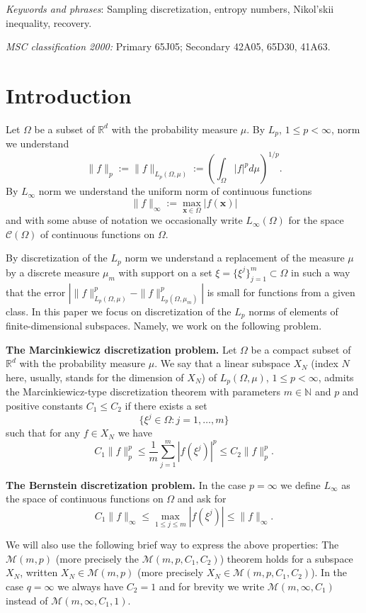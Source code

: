 \documentclass[12pt]{article}
\newcommand{\N}{{\mathbb{N}}}
\def\cC{{\mathcal C}}
\def \cM{\mathcal M}
\def\R{{\mathbb R}}
\def\bx{\mathbf x}
\numberwithin{equation}{section}
\newcommand{\be}{\begin{equation}}
\newcommand{\ee}{\end{equation}}
\begin{document}
{\it Keywords and phrases}: Sampling discretization, entropy numbers, Nikol'skii inequality, recovery.

{\it MSC classification 2000:} Primary 65J05; Secondary 42A05, 65D30, 41A63.

\section{Introduction} 

Let $\Omega$ be a subset of $\R^d$ with the probability measure $\mu$. By $L_p$, $1\le p< \infty$, norm we understand
$$
\|f\|_p:=\|f\|_{L_p(\Omega,\mu)} := \left(\int_\Omega |f|^pd\mu\right)^{1/p}.
$$
By $L_\infty$ norm we understand the uniform norm of continuous functions
$$
\|f\|_\infty := \max_{\bx\in\Omega} |f(\bx)|
$$
and with some abuse of notation we occasionally write $L_\infty(\Omega)$ for the space $\cC(\Omega)$ of continuous functions on $\Omega$.

By discretization of the $L_p$ norm we understand a replacement of the measure $\mu$ by
a discrete measure $\mu_m$ with support on a set $\xi =\{\xi^j\}_{j=1}^m \subset \Omega$   in such a way that the error $|\|f\|^p_{L_p(\Omega,\mu)} - \|f\|^p_{L_p(\Omega,\mu_m)}|$ is small for functions from a given class. In this paper we focus on discretization of the $L_p$ norms of elements of finite-dimensional subspaces. Namely, we work on the following problem. 

{\bf The Marcinkiewicz discretization problem.} Let $\Omega$ be a compact subset of $\R^d$ with the probability measure $\mu$. We say that a linear subspace $X_N$ (index $N$ here, usually, stands for the dimension of $X_N$) of $L_p(\Omega,\mu)$, $1\le p < \infty$, admits the Marcinkiewicz-type discretization theorem with parameters $m\in \N$ and $p$ and positive constants $C_1\le C_2$ if there exists a set  
$$
\Big\{\xi^j \in \Omega: j=1,\dots,m\Big\}
$$
 such that for any $f\in X_N$ we have
\be\label{I1}
C_1\|f\|_p^p \le \frac{1}{m} \sum_{j=1}^m |f(\xi^j)|^p \le C_2\|f\|_p^p.
\ee

{\bf The Bernstein discretization problem.} In the case $p=\infty$ we define $L_\infty$ as the space of continuous functions on $\Omega$  and ask for
\begin{equation}\label{I2}
C_1\|f\|_\infty \le \max_{1\le j\le m} |f(\xi^j)| \le  \|f\|_\infty.
\end{equation}

We will also use the following brief way to express the above properties: The $\cM(m,p)$ (more precisely the $\cM(m,p,C_1,C_2)$) theorem holds for  a subspace $X_N$, written $X_N \in \cM(m,p)$ (more precisely $X_N \in \cM(m,p,C_1,C_2)$). In the case $q=\infty$ we always have $C_2=1$ and for brevity we write $\cM(m,\infty,C_1)$ instead of $\cM(m,\infty,C_1,1)$.
\end{document}
